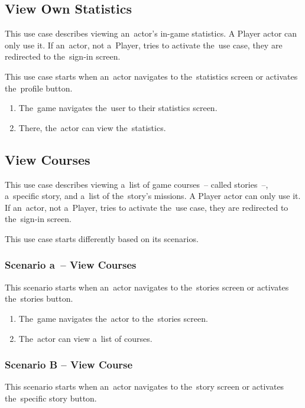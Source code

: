 \subsection{View Own Statistics}

This use case describes viewing an~actor's in-game statistics.
A Player actor can only use it.
If an~actor, not a~Player, tries to activate the~use case, they are redirected to the~sign-in screen.

This use case starts when an~actor navigates to the~statistics screen or activates the~profile button.

\begin{enumerate}
    \item The~game navigates the~user to their statistics screen.
    \item There, the~actor can view the~statistics.
\end{enumerate}

\pagebreak
\subsection{View Courses}

This use case describes viewing a~list of game courses~-- called stories~--, a~specific story, and a~list of the~story's missions.
A Player actor can only use it.
If an~actor, not a~Player, tries to activate the~use case, they are redirected to the~sign-in screen.

This use case starts differently based on its scenarios.

\subsubsection*{Scenario a~-- View Courses}

This scenario starts when an~actor navigates to the~stories screen or activates the~stories button.

\begin{enumerate}
    \item The~game navigates the~actor to the~stories screen.
    \item The~actor can view a~list of courses.
\end{enumerate}

\subsubsection*{Scenario B -- View Course}

This scenario starts when an~actor navigates to the~story screen or activates the~specific story button.


